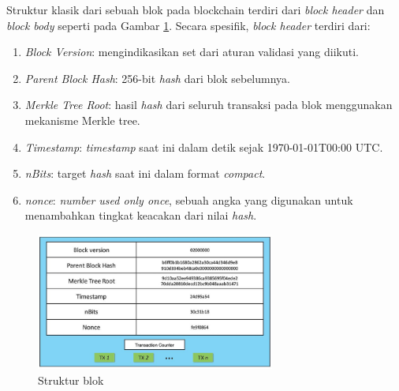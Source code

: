 Struktur klasik dari sebuah blok pada blockchain terdiri dari \textit{block header} dan \textit{block body} seperti pada Gambar \ref{image:struktur-blok}. Secara spesifik, \textit{block header} terdiri dari:

\begin{enumerate}
	\item \textit{Block Version}: mengindikasikan set dari aturan validasi yang diikuti.
	\item \textit{Parent Block Hash}: 256-bit \textit{hash} dari blok sebelumnya.
	\item \textit{Merkle Tree Root}: hasil \textit{hash} dari seluruh transaksi pada blok menggunakan mekanisme Merkle tree.
	\item \textit{Timestamp}: \textit{timestamp} saat ini dalam detik sejak 1970-01-01T00:00 UTC.
	\item \textit{nBits}: target \textit{hash} saat ini dalam format \textit{compact}.
	\item \textit{nonce}: \textit{number used only once}, sebuah angka yang digunakan untuk menambahkan tingkat keacakan dari nilai \textit{hash}.
\end{enumerate}

\begin{figure}[ht]
	\centering
	\includegraphics[width=0.7\textwidth]{resources/chapter-2/struktur-block.png}
	\caption{Struktur blok \parencite{zheng2018blockchain}}
	\label{image:struktur-blok}
\end{figure}